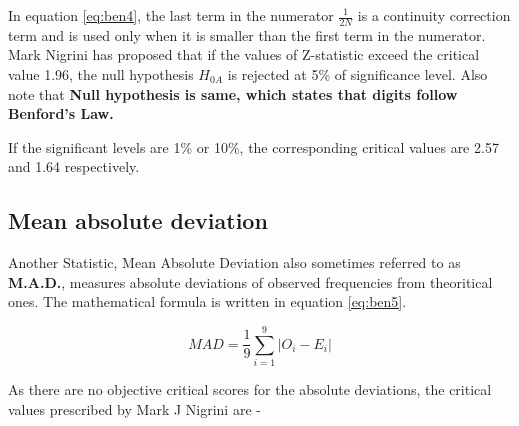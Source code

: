\documentclass[
]{book}
\begin{document}
In equation \eqref{eq:ben4}, the last term in the numerator \(\frac{1}{2N}\) is a continuity correction term and is used only when it is smaller than the first term in the numerator. Mark Nigrini has proposed that if the values of Z-statistic exceed the critical value 1.96, the null hypothesis \(H_{0A}\) is rejected at 5\% of significance level. Also note that \textbf{Null hypothesis is same, which states that digits follow Benford's Law.}

If the significant levels are 1\% or 10\%, the corresponding critical values are 2.57 and 1.64 respectively.

\hypertarget{mean-absolute-deviation}{%
\subsection{Mean absolute deviation}\label{mean-absolute-deviation}}

Another Statistic, Mean Absolute Deviation also sometimes referred to as \textbf{M.A.D.}, measures absolute deviations of observed frequencies from theoritical ones. The mathematical formula is written in equation \eqref{eq:ben5}.

\begin{equation} 
MAD = \frac{1}{9} \sum_{i=1}^{9} |O_i - E_i|
\label{eq:ben5}
\end{equation}

As there are no objective critical scores for the absolute deviations, the critical values prescribed by Mark J Nigrini are -
\end{document}

